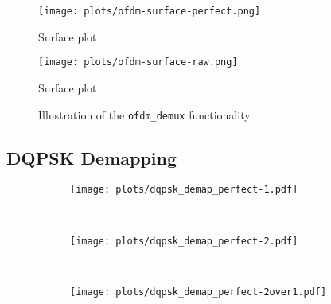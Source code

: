 \documentclass[class=report,11pt,crop=false]{standalone}
\begin{document}
\begin{figure}[htbp]
  \centering
  \captionsetup{type=figure}
  \texttt{[image: plots/ofdm-surface-perfect.png]}
  \caption{Surface plot}
  \label{fig:ofdm-surface-perfect}
\end{figure}

\begin{figure}[htbp]
  \centering
  \captionsetup{type=figure}
  \texttt{[image: plots/ofdm-surface-raw.png]}
  \caption{Surface plot}
  \label{fig:ofdm-surface-raw}
\end{figure}



\begin{figure}[htbp]
  \centering
  \captionsetup{type=figure}
  \def\svgwidth{\linewidth}
  { %
      }
  \caption{Illustration of the \texttt{ofdm\_demux} functionality}
  \label{fig:ofdm_demux}
\end{figure}



\subsection{DQPSK Demapping \label{subsect:dab-proc_dqpsk-demap}}

\begin{figure}[htbp]
  \centering
  \begin{subfigure}[t]{0.3\textwidth}
    \centering
    \captionsetup{type=figure}
    \texttt{[image: plots/dqpsk\_demap\_perfect-1.pdf]}
    \caption{}
    \label{fig:dqpsk_demap_perfect-1}
  \end{subfigure}%
  ~ 
  \begin{subfigure}[t]{0.3\textwidth}
    \centering
    \captionsetup{type=figure}
    \texttt{[image: plots/dqpsk\_demap\_perfect-2.pdf]}
    \caption{}
    \label{fig:dqpsk_demap_perfect-2}
  \end{subfigure}
  ~ 
  \begin{subfigure}[t]{0.3\textwidth}
    \centering
    \captionsetup{type=figure}
    \texttt{[image: plots/dqpsk\_demap\_perfect-2over1.pdf]}
    \caption{}
    \label{fig:dqpsk_demap_perfect-2over1}
  \end{subfigure}
  \caption{}
  \label{fig:dqpsk_demap_perfect}
\end{figure}
\end{document}

